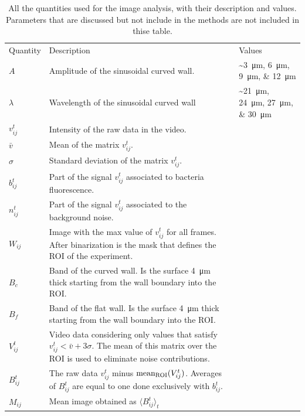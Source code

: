 \begin{table}[!h]
   \centering
    \small
    \caption[Summary of all quantities used in the image analysis]{All the quantities used for the image analysis, with their description and values. Parameters that are discussed but not include in the methods are not included in thise table. }
    \begin{tabularx}{\textwidth}{lXl}
    \hline\noalign{\smallskip}
         Quantity  & Description & Values   \\
    \noalign{\smallskip}\hline\noalign{\smallskip}
         $A$ & Amplitude of the sinusoidal curved wall. & \sim \SIlist[list-units=single, list-final-separator = {, }]{3;6;9;12}{\micro\meter} \\ 
         $\lambda$ & Wavelength of the sinusoidal curved wall & \sim \SIlist[list-units=single, list-final-separator = {, }]{21;24;27;30}{\micro\meter} \\
         $v_{ij}^t$ & Intensity of the raw data in the video. & \quad \\
         $\bar{v}$ & Mean of the matrix $v_{ij}^t$. & \quad \\
         $\sigma$ & Standard deviation of the matrix $v_{ij}^t$. & \quad \\
         $b_{ij}^t$ & Part of the signal $v_{ij}^t$ associated to bacteria fluorescence. & \quad \\
         $n_{ij}^t$ & Part of the signal $v_{ij}^t$ associated to the background noise. & \quad \\
         $W_{ij}$ & Image with the max value of $v_{ij}^t$ for all frames. After binarization is the mask that defines the ROI of the experiment. & \quad \\
         $B_c$ & Band of the curved wall. Is the surface \SI{4}{\micro\meter} thick starting from the wall boundary into the ROI.  & \quad \\
         $B_f$ & Band of the flat wall. Is the surface \SI{4}{\micro\meter} thick starting from the wall boundary into the ROI.  & \quad \\
         $V_{ij}^t$ & Video data considering only values that satisfy $v_{ij}^t  < \bar{v} + 3 \sigma$. The mean of this matrix over the ROI is used to eliminate noise contributions.  & \quad \\
         $B_{ij}^t$ & The raw data $v_{ij}^t$ minus ${\rm mean_{ROI}}(V_{ij}^t)$. Averages of $B_{ij}^t$ are equal to one done exclusively with $b_{ij}^t$.  & \quad \\
         $M_{ij}$ & Mean image obtained as $\langle B_{ij}^t \rangle_t$  & \quad \\

\end{tabularx}
\end{table}
